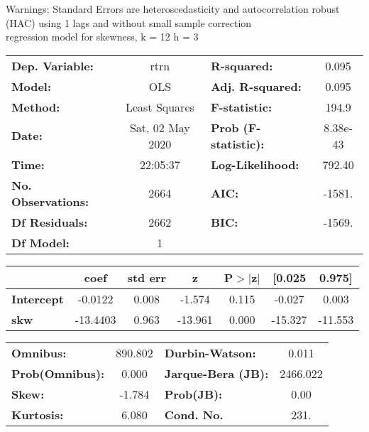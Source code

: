 Warnings: \newline
 [1] Standard Errors are heteroscedasticity and autocorrelation robust (HAC) using 1 lags and without small sample correction\\ 

regression model for skewness, k = 12 h = 3\begin{center}
\begin{tabular}{lclc}
\toprule
\textbf{Dep. Variable:}    &       rtrn       & \textbf{  R-squared:         } &     0.095   \\
\textbf{Model:}            &       OLS        & \textbf{  Adj. R-squared:    } &     0.095   \\
\textbf{Method:}           &  Least Squares   & \textbf{  F-statistic:       } &     194.9   \\
\textbf{Date:}             & Sat, 02 May 2020 & \textbf{  Prob (F-statistic):} &  8.38e-43   \\
\textbf{Time:}             &     22:05:37     & \textbf{  Log-Likelihood:    } &    792.40   \\
\textbf{No. Observations:} &        2664      & \textbf{  AIC:               } &    -1581.   \\
\textbf{Df Residuals:}     &        2662      & \textbf{  BIC:               } &    -1569.   \\
\textbf{Df Model:}         &           1      & \textbf{                     } &             \\
\bottomrule
\end{tabular}
\begin{tabular}{lcccccc}
                   & \textbf{coef} & \textbf{std err} & \textbf{z} & \textbf{P$> |$z$|$} & \textbf{[0.025} & \textbf{0.975]}  \\
\midrule
\textbf{Intercept} &      -0.0122  &        0.008     &    -1.574  &         0.115        &       -0.027    &        0.003     \\
\textbf{skw}       &     -13.4403  &        0.963     &   -13.961  &         0.000        &      -15.327    &      -11.553     \\
\bottomrule
\end{tabular}
\begin{tabular}{lclc}
\textbf{Omnibus:}       & 890.802 & \textbf{  Durbin-Watson:     } &    0.011  \\
\textbf{Prob(Omnibus):} &   0.000 & \textbf{  Jarque-Bera (JB):  } & 2466.022  \\
\textbf{Skew:}          &  -1.784 & \textbf{  Prob(JB):          } &     0.00  \\
\textbf{Kurtosis:}      &   6.080 & \textbf{  Cond. No.          } &     231.  \\
\bottomrule
\end{tabular}
\end{center}

